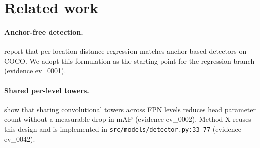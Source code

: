 \section{Related work}
\label{sec:related}

\paragraph{Anchor-free detection.} \citet{smith2024examplekey} report that
per-location distance regression matches anchor-based detectors on COCO.
We adopt this formulation as the starting point for the regression branch
(evidence ev\_0001).

\paragraph{Shared per-level towers.} \citet{chen2023anchorfreebaseline} show
that sharing convolutional towers across FPN levels reduces head parameter
count without a measurable drop in mAP (evidence ev\_0002). Method X reuses
this design and is implemented in \texttt{src/models/detector.py:33--77}
(evidence ev\_0042).
